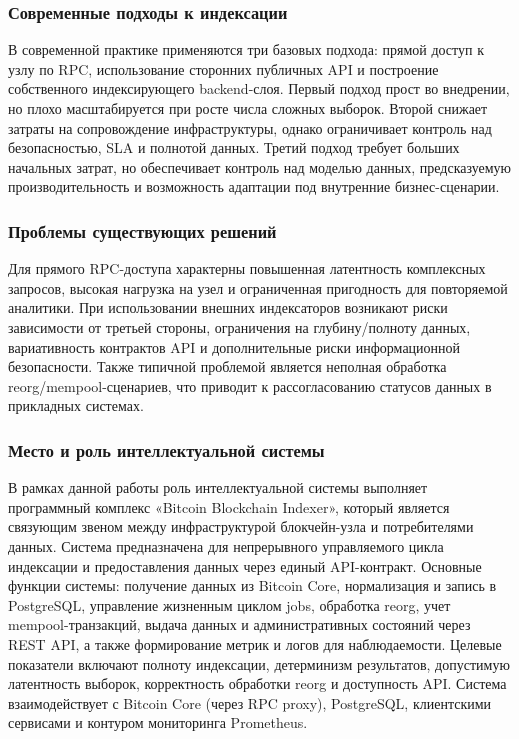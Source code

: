 ﻿\documentclass[14pt,a4paper]{extarticle}
\begin{document}
\subsubsection{Современные подходы к индексации}
\noindent В современной практике применяются три базовых подхода: прямой доступ к узлу по RPC, использование сторонних публичных API и построение собственного индексирующего backend-слоя. Первый подход прост во внедрении, но плохо масштабируется при росте числа сложных выборок. Второй снижает затраты на сопровождение инфраструктуры, однако ограничивает контроль над безопасностью, SLA и полнотой данных. Третий подход требует больших начальных затрат, но обеспечивает контроль над моделью данных, предсказуемую производительность и возможность адаптации под внутренние бизнес-сценарии.

\subsubsection{Проблемы существующих решений}
\noindent Для прямого RPC-доступа характерны повышенная латентность комплексных запросов, высокая нагрузка на узел и ограниченная пригодность для повторяемой аналитики. При использовании внешних индексаторов возникают риски зависимости от третьей стороны, ограничения на глубину/полноту данных, вариативность контрактов API и дополнительные риски информационной безопасности. Также типичной проблемой является неполная обработка reorg/mempool-сценариев, что приводит к рассогласованию статусов данных в прикладных системах.

\subsubsection{Место и роль интеллектуальной системы}
\noindent В рамках данной работы роль интеллектуальной системы выполняет программный комплекс «Bitcoin Blockchain Indexer», который является связующим звеном между инфраструктурой блокчейн-узла и потребителями данных. Система предназначена для непрерывного управляемого цикла индексации и предоставления данных через единый API-контракт. Основные функции системы: получение данных из Bitcoin Core, нормализация и запись в PostgreSQL, управление жизненным циклом jobs, обработка reorg, учет mempool-транзакций, выдача данных и административных состояний через REST API, а также формирование метрик и логов для наблюдаемости. Целевые показатели включают полноту индексации, детерминизм результатов, допустимую латентность выборок, корректность обработки reorg и доступность API. Система взаимодействует с Bitcoin Core (через RPC proxy), PostgreSQL, клиентскими сервисами и контуром мониторинга Prometheus.
\end{document}
